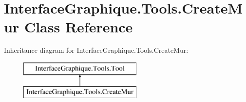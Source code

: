 \hypertarget{class_interface_graphique_1_1_tools_1_1_create_mur}{}\section{Interface\+Graphique.\+Tools.\+Create\+Mur Class Reference}
\label{class_interface_graphique_1_1_tools_1_1_create_mur}
Inheritance diagram for Interface\+Graphique.\+Tools.\+Create\+Mur\+:\begin{figure}[H]
\begin{center}
\leavevmode
\includegraphics[height=2.000000cm]{class_interface_graphique_1_1_tools_1_1_create_mur}
\end{center}
\end{figure}
